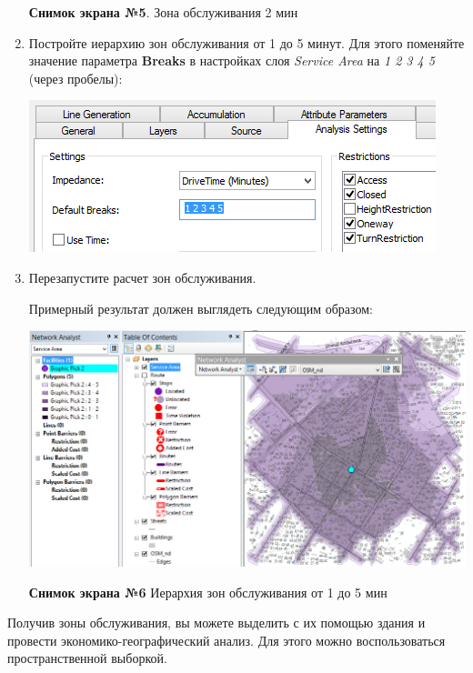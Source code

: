 \documentclass[]{book}
\theoremstyle{definition}
\theoremstyle{definition}
\theoremstyle{definition}
\theoremstyle{remark}
\begin{document}
\begin{enumerate}
  \textbf{Снимок экрана №5}. Зона обслуживания 2 мин
\item
  Постройте иерархию зон обслуживания от 1 до 5 минут. Для этого
  поменяйте значение параметра \textbf{Breaks} в настройках слоя
  \emph{Service Area} на \emph{1 2 3 4 5} (через пробелы):

  \includegraphics{images/Ex12/image16.png}
\item
  Перезапустите расчет зон обслуживания.

  Примерный результат должен выглядеть следующим образом:

  \includegraphics{images/Ex12/image17.png}

  \textbf{Снимок экрана №6} Иерархия зон обслуживания от 1 до 5 мин
\end{enumerate}

Получив зоны обслуживания, вы можете выделить с их помощью здания и
провести экономико-географический анализ. Для этого можно
воспользоваться пространственной выборкой.
\end{document}
